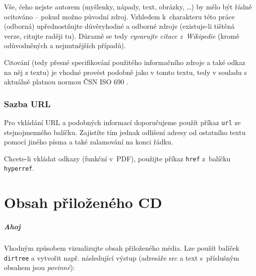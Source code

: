 \documentclass[thesis=M,czech]{FITthesis}[2012/10/20]
\begin{document}
Vše, čeho nejste autorem (myšlenky, nápady, text, obrázky, \ldots) by mělo být řádně ocitováno -- pokud možno původní zdroj. Vzhledem k~charakteru této práce (odborná) upřednostňujte důvěryhodné a odborné zdroje (existuje-li tištěná verze, citujte raději tu). Důrazně se tedy \emph{vyvarujte citace z~Wikipedie} (kromě odůvodněných a nejnutnějších případů).

Citování (tedy přesné specifikování použitého informačního zdroje a také odkaz na něj z textu) je vhodné provést podobně jako v tomto textu, tedy v souladu s aktuálně platnou normou ČSN ISO 690 \cite{iso690}.

\subsection{Sazba URL}

Pro vkládání URL a podobných informací doporučujeme použít příkaz \verb|url| ze stejnojmenného balíčku. Zajistíte tím jednak odlišení adresy od ostatního textu pomocí jiného písma a také zalamování na konci řádku.

Chcete-li vkládat odkazy (funkční v~PDF), použijte příkaz \verb|href| z~balíčku \verb|hyperref|.


\chapter{Obsah přiloženého CD}

\paragraph{Ahoj} \cite{sitova-karta-s-fpga-xilinx}

Vhodným způsobem vizualizujte obsah přiloženého média. Lze použít balíček \verb|dirtree| a vytvořit např. následující výstup (adresáře src a text s~příslušným obsahem jsou \emph{povinné}):

\begin{figure}
\end{figure}
\end{document}

